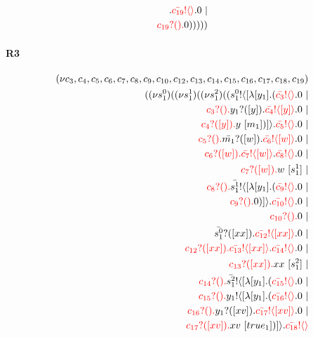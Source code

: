 \documentclass{article}
\begin{document}
\begin{align*}
\color{black}.\color{red}\bar{c_{19}}! \langle  \rangle \color{black}.0  \ | \\ \color{red}c_{19}?().\color{black}0 )))))
\end{align*}
\paragraph{R3}
\begin{align*}
 (\nu c_{3},c_{4},c_{5},c_{6},c_{7},c_{8},c_{9},c_{10},c_{12},c_{13},c_{14},c_{15},c_{16},c_{17},c_{18},c_{19}) \\ ( (\nu s^{0}_{1})( (\nu s^{1}_{1})( (\nu s^{2}_{1})((\color{black}s^{0}_{1}! \langle [ \lambda [y_{1}].(\color{red}\bar{c_{3}}! \langle  \rangle \color{black}.0  \ | \\ \color{red}c_{3}?().\color{black}\color{black}y_{1}?([y]).\color{black}\color{red}\bar{c_{4}}! \langle [y] \rangle \color{black}.0  \ | \\ \color{red}c_{4}?([y]).\color{black}y \ [m_{1}])] \rangle \color{black}.\color{red}\bar{c_{5}}! \langle  \rangle \color{black}.0  \ | \\ \color{red}c_{5}?().\color{black}\color{black}\bar{m_{1}}?([w]).\color{black}\color{red}\bar{c_{6}}! \langle [w] \rangle \color{black}.0  \ | \\ \color{red}c_{6}?([w]).\color{black}\color{red}\bar{c_{7}}! \langle [w] \rangle \color{black}.\color{red}\bar{c_{8}}! \langle  \rangle \color{black}.0  \ | \\ \color{red}c_{7}?([w]).\color{black}w \ [s^{1}_{1}] \ | \\ \color{red}c_{8}?().\color{black}\color{black}\bar{s^{1}_{1}}! \langle [ \lambda [y_{1}].(\color{red}\bar{c_{9}}! \langle  \rangle \color{black}.0  \ | \\ \color{red}c_{9}?().\color{black}0 )] \rangle \color{black}.\color{red}\bar{c_{10}}! \langle  \rangle \color{black}.0  \ | \\ \color{red}c_{10}?().\color{black}0  \ | \\ \color{black}\bar{s^{0}_{1}}?([xx]).\color{black}\color{red}\bar{c_{12}}! \langle [xx] \rangle \color{black}.0  \ | \\ \color{red}c_{12}?([xx]).\color{black}\color{red}\bar{c_{13}}! \langle [xx] \rangle \color{black}.\color{red}\bar{c_{14}}! \langle  \rangle \color{black}.0  \ | \\ \color{red}c_{13}?([xx]).\color{black}xx \ [s^{2}_{1}] \ | \\ \color{red}c_{14}?().\color{black}\color{black}\bar{s^{2}_{1}}! \langle [ \lambda [y_{1}].(\color{red}\bar{c_{15}}! \langle  \rangle \color{black}.0  \ | \\ \color{red}c_{15}?().\color{black}\color{black}y_{1}! \langle [ \lambda [y_{1}].(\color{red}\bar{c_{16}}! \langle  \rangle \color{black}.0  \ | \\ \color{red}c_{16}?().\color{black}\color{black}y_{1}?([xv]).\color{black}\color{red}\bar{c_{17}}! \langle [xv] \rangle \color{black}.0  \ | \\ \color{red}c_{17}?([xv]).\color{black}xv \ [true_{1}])] \rangle \color{black}.\color{red}\bar{c_{18}}! \langle  \rangle 
\end{align*}
\end{document}
